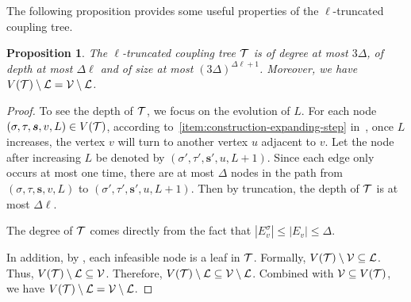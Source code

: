 \documentclass[11pt]{article}
\newtheorem{lemma}[theorem]{Lemma}
\newtheorem{corollary}[theorem]{Corollary}
\newtheorem{proposition}[theorem]{Proposition}
\newcommand{\abs}[1]{\left\vert#1\right\vert}
\newcommand{\seqS}{\boldsymbol{s}}
\newcommand{\qgl}[1]{{\color{purple}{#1}}}
\newcommand{\hktodo}[1]{{\color{blue}{#1}}}
\begin{document}
The following proposition provides some useful properties of the $\ell$-truncated coupling tree.


\begin{proposition} \label{prop:property-of-truncated-tree}
The $\ell$-truncated coupling tree $\mathcal{T}$ is of degree at most $3\Delta$, of depth at most $\Delta \ell$ and of size at most $\left(3\Delta\right)^{\Delta \ell + 1}$.
Moreover, we have $V(\mathcal{T})\setminus \mathcal{L} = \mathcal{V}\setminus\mathcal{L}$.
\end{proposition}

\hktodo{polish the proof here}
\begin{proof}
	To see the depth of $\mathcal{T}$, we focus on the evolution of $L$. For each node $(\sigma, \tau, \seqS, v, L) \in V(\+T)$, according to~\eqref{item:construction-expanding-step} in~, once $L$ increases, the vertex $v$ will turn to another vertex $u$ adjacent to $v$. Let the node after increasing $L$ be denoted by $(\sigma', \tau', \seqS', u, L + 1)$. Since each edge only occurs at most one time, there are at most $\Delta$ nodes in the path from $(\sigma, \tau, \seqS, v, L)$ to $(\sigma', \tau', \seqS', u, L + 1)$. Then by truncation, the depth of $\mathcal{T}$ is at most $\Delta \ell$.
	
	The degree of $\mathcal{T}$ comes directly from the fact that $\abs{E_v^\sigma} \le \abs{E_v} \le \Delta$.

    \hktodo{rewrite this paragraph}
    
    In addition, by ,  each infeasible node is a leaf in $\mathcal{T}$.
    Formally, $V(\mathcal{T}) \setminus \mathcal{V} \subseteq \mathcal{L}$.
    Thus,  $V(\mathcal{T}) \setminus \mathcal{L} \subseteq \mathcal{V}$.
    Therefore, $V(\mathcal{T}) \setminus \mathcal{L} \subseteq \mathcal{V}\setminus \mathcal{L}$.
    Combined with $\mathcal{V}\subseteq V(\mathcal{T})$, we have $V(\mathcal{T}) \setminus \mathcal{L} = \mathcal{V}\setminus \mathcal{L}$.
    
\end{proof}




%
%
\end{document}
